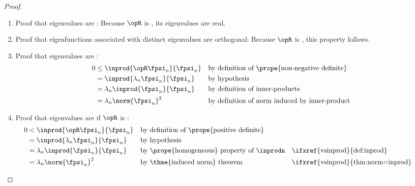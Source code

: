 \begin{proof}
\begin{enumerate}
\item Proof that eigenvalues are :
Because $\opR$ is , its eigenvalues are real.

\item Proof that eigenfunctions associated with distinct eigenvalues are orthogonal:
Because $\opR$ is , this property follows.

\item Proof that eigenvalues are :
      \begin{align*}
         0 &\le \inprod{\opR \fpsi_n}{\fpsi_n}
           &&   \text{by definition of \prope{non-negative definite}}
         \\&=   \inprod{\lambda_n \fpsi_n}{\fpsi_n}
           &&   \text{by hypothesis}
         \\&=   \lambda_n \inprod{\fpsi_n}{\fpsi_n}
           &&   \text{by definition of inner-products}
         \\&=   \lambda_n \norm{\fpsi_n}^2
           &&   \text{by definition of norm induced by inner-product}
      \end{align*}

\item Proof that eigenvalues are  if $\opR$ is :
      \begin{align*}
         0 &< \inprod{\opR \fpsi_n}{\fpsi_n}
           && \text{by definition of \prope{positive definite}}
         \\&= \inprod{\lambda_n \fpsi_n}{\fpsi_n}
           && \text{by hypothesis}
         \\&= \lambda_n \inprod{\fpsi_n}{\fpsi_n}
           && \text{by \prope{homogeneous} property of $\inprodn$}
           && \text{\ifxref{vsinprod}{def:inprod}}
         \\&= \lambda_n \norm{\fpsi_n}^2
           && \text{by \thme{induced norm} theorem}
           && \text{\ifxref{vsinprod}{thm:norm=inprod}}
      \end{align*}
\end{enumerate}
\end{proof}

